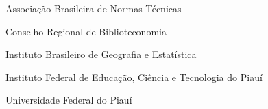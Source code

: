 %
\clearpage
\begin{siglas}
  \item[ABNT] Associação Brasileira de Normas Técnicas
  \item[CRB] Conselho Regional de Biblioteconomia
  \item[IBGE] Instituto Brasileiro de Geografia e Estatística
  \item[IFPI] Instituto Federal de Educação, Ciência e Tecnologia do Piauí
  \item[UFPI] Universidade Federal do Piauí
\end{siglas}
